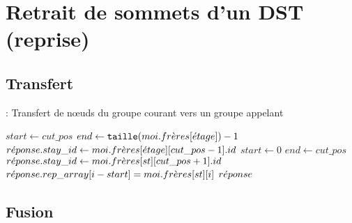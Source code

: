 
\chapter{Retrait de sommets d'un DST (reprise)}
\section{Transfert}

\begin{algorithm}
\caption{: Transfert de n\oe uds du groupe courant vers un groupe appelant}\label{a:tr}
\begin{algorithmic}[1]
\Statex
{}
		\State $start \gets cut\_pos$
		\State $end \gets {\tt taille}(moi.fr\grave{e} res[\acute{e} tage]) - 1$
		\State $r\acute{e} ponse.stay\_id \gets moi.fr\grave{e} res[\acute{e} tage][cut\_pos - 1].id$
	\Else
		\State $start \gets 0$
		\State $end \gets cut\_pos$
		\State $r\acute{e} ponse.stay\_id \gets moi.fr\grave{e} res[st][cut\_pos + 1].id$
	\EndIf
	\Statex
		\State $r\acute{e} ponse.rep\_array[i - start] = moi.fr\grave{e} res[st][i]$
	\EndFor
	\Statex
	\State {}
	\Statex
	\State \Return $r\acute{e} ponse$
\EndProcedure
\end{algorithmic}
\end{algorithm}

\section{Fusion}